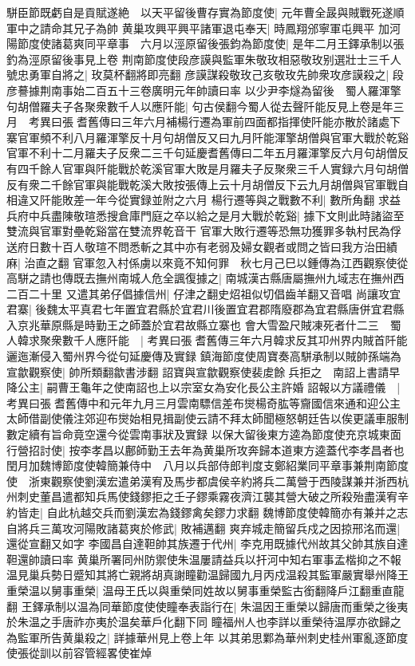 駢臣節既虧自是貢賦遂絶　以天平留後曹存實為節度使|{
	元年曹全晸與賊戰死遂順軍中之請命其兄子為帥}
黄巢攻興平興平諸軍退屯奉天|{
	時鳳翔邠寧軍屯興平}
加河陽節度使諸葛爽同平章事　六月以涇原留後張鈞為節度使|{
	是年二月王鐸承制以張釣為涇原留後事見上卷}
荆南節度使段彦謨與監軍朱敬玫相惡敬玫别選壯士三千人號忠勇軍自將之|{
	玫莫杯翻將即亮翻}
彦謨謀殺敬玫己亥敬玫先帥衆攻彦謨殺之|{
	段彦謩據荆南事始二百五十三卷廣明元年帥讀曰率}
以少尹李燧為留後　蜀人羅渾擎句胡僧羅夫子各聚衆數千人以應阡能|{
	句古侯翻今蜀人從去聲阡能反見上卷是年三月　考異曰張耆舊傳曰三年六月補楊行遷為軍前四面都指揮使阡能亦散於諸處下寨官軍頻不利八月羅渾擎反十月句胡僧反又曰九月阡能渾擎胡僧與官軍大戰於乾谿官軍不利十二月羅夫子反衆二三千句延慶耆舊傳曰二年五月羅渾擎反六月句胡僧反有四千餘人官軍與阡能戰於乾溪官軍大敗是月羅夫子反聚衆三千人實録六月句胡僧反有衆二千餘官軍與能戰乾溪大敗按張傳上云十月胡僧反下云九月胡僧與官軍戰自相違又阡能敗差一年今從實録並附之六月}
楊行遷等與之戰數不利|{
	數所角翻}
求益兵府中兵盡陳敬瑄悉搜倉庫門庭之卒以給之是月大戰於乾谿|{
	據下文則此時諸盜至雙流與官軍對壘乾谿當在雙流界乾音干}
官軍大敗行遷等恐無功獲罪多執村民為俘送府日數十百人敬瑄不問悉斬之其中亦有老弱及婦女觀者或問之皆曰我方治田績麻|{
	治直之翻}
官軍忽入村係虜以來竟不知何罪　秋七月己巳以鍾傳為江西觀察使從高駢之請也傳既去撫州南城人危全諷復據之|{
	南城漢古縣唐屬撫州九域志在撫州西二百二十里}
又遣其弟仔倡據信州|{
	仔津之翻史炤祖似切倡齒羊翻又音唱}
尚讓攻宜君寨|{
	後魏太平真君七年置宜君縣於宜君川後置宜君郡隋廢郡為宜君縣唐併宜君縣入京兆華原縣是時勤王之師蓋於宜君故縣立寨也}
會大雪盈尺賊凍死者什二三　蜀人韓求聚衆數千人應阡能　|{
	考異曰張耆舊傳三年六月韓求反其卭州界内賊首阡能邐迤漸侵入蜀州界今從句延慶傳及實録}
鎮海節度使周寶奏高駢承制以賊帥孫端為宣歙觀察使|{
	帥所類翻歙書涉翻}
詔寶與宣歙觀察使裴䖍餘兵拒之　南詔上書請早降公主|{
	嗣曹王龜年之使南詔也上以宗室女為安化長公主許婚}
詔報以方議禮儀　|{
	考異曰張耆舊傳中和元年九月三月雲南驃信差布爕楊奇肱等齎國信來通和迎公主太師借副使儀注郊迎布爕始相見揖副使云請不拜太師聞極怒朝廷告以俟更議車服制數定續有旨命竟空還今從雲南事狀及實録}
以保大留後東方逵為節度使充京城東面行營招討使|{
	按李孝昌以鄜師勤王去年為黄巢所攻奔歸本道東方逵蓋代李孝昌者也}
閏月加魏博節度使韓簡兼侍中　八月以兵部侍郎判度支鄭紹業同平章事兼荆南節度使　浙東觀察使劉漢宏遣弟漢宥及馬步都虞侯辛約將兵二萬營于西陵謀兼并浙西杭州刺史董昌遣都知兵馬使錢鏐拒之壬子鏐乘霧夜濟江襲其營大破之所殺殆盡漢宥辛約皆走|{
	自此杭越交兵而劉漢宏為錢鏐禽矣鏐力求翻}
魏博節度使韓簡亦有兼并之志自將兵三萬攻河陽敗諸葛爽於修武|{
	敗補邁翻}
爽弃城走簡留兵戍之因掠邢洺而還|{
	還從宣翻又如字}
李國昌自達靼帥其族遷于代州|{
	李克用既據代州故其父帥其族自達靼還帥讀曰率}
黄巢所署同州防禦使朱温屢請益兵以扞河中知右軍事孟楷抑之不報温見巢兵勢日蹙知其將亡親將胡真謝瞳勸温歸國九月丙戍温殺其監軍嚴實舉州降王重榮温以舅事重榮|{
	温母王氏以與重榮同姓故以舅事重榮監古銜翻降戶江翻重直龍翻}
王鐸承制以温為同華節度使使瞳奉表詣行在|{
	朱温因王重榮以歸唐而重榮之後夷於朱温之手唐祚亦夷於温矣華戶化翻下同}
瞳福州人也李詳以重榮待温厚亦欲歸之為監軍所告黄巢殺之|{
	詳據華州見上卷上年}
以其弟思鄴為華州刺史桂州軍亂逐節度使張從訓以前容管經畧使崔焯

